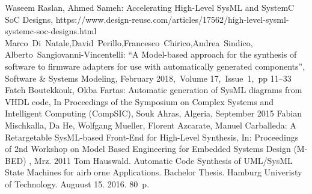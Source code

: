 \documentclass{llncs}
\begin{document}
\begin{thebibliography}{99}
 Waseem Raslan, Ahmed Sameh: Accelerating High-Level SysML and SystemC SoC Designs, https://www.design-reuse.com/articles/17562/high-level-sysml-systemc-soc-designs.html
 Marco~Di~Natale,David~Perillo,Francesco~Chirico,Andrea~Sindico, Alberto~Sangiovanni-Vincentelli: “A Model-based approach for the synthesis of software to firmware adapters for use with automatically generated components”, Software \& Systems Modeling, February 2018,~Volume 17,~Issue~1,~pp 11–33
 Fateh Boutekkouk, Okba Fartas: Automatic generation of SysML diagrams from VHDL code, In Proceedings of the Symposium on Complex Systems and Intelligent Computing (CompSIC), Souk Ahras, Algeria, September 2015
 Fabian Mischkalla, Da He, Wolfgang Mueller, Florent Azcarate, Manuel Carballeda: A Retargetable SysML-based Front-End for High-Level Synthesis, In: Proceedings of 2nd Workshop on Model Based Engineering for Embedded Systems Design (M-BED) , Mrz. 2011
Tom Hauswald. Automatic Code Synthesis of UML/SysML State Machines for airb orne Applications.  Bachelor Thesis. Hamburg Univeristy of Technology. Auguust 15. 2016. 80~p.
\end{thebibliography}
\end{document}
